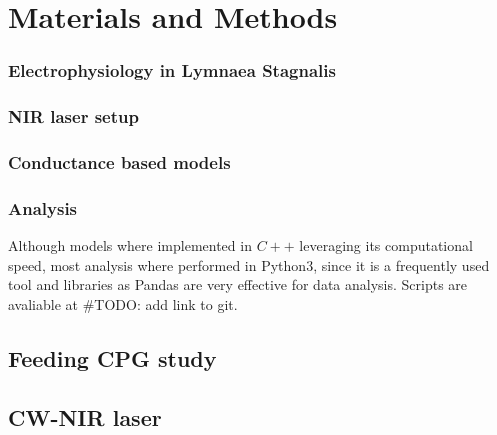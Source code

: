 \chapter{Materials and Methods}
\subsection{Electrophysiology in Lymnaea Stagnalis}

\subsection{NIR laser setup}
\subsection{Conductance based models}
\subsection{Analysis}
Although models where implemented in $C++$ leveraging its computational speed, most analysis where performed in Python3, since it is a frequently used tool and libraries as Pandas are very effective for data analysis. 
Scripts are avaliable at #TODO: add link to git. 

\section{Feeding CPG study}

\section{CW-NIR laser}
